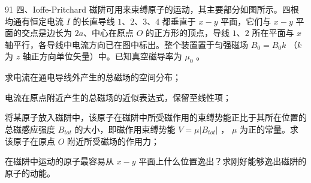 \begin{problem}[第35届全国中学生物理竞赛复赛][磁阱束缚]{91}
四、Ioffe-Pritchard 磁阱可用来束缚原子的运动，其主要部分如图所示。四根均通有恒定电流 $I$ 的长直导线 $1$、$2$、$3$、$4$ 都垂直于 $x-y$ 平面，它们与 $x-y$ 平面的交点是边长为 $2a$、中心在原点 $O$ 的正方形的顶点，导线 $1$、$2$ 所在平面与 $x$ 轴平行，各导线中电流方向已在图中标出。整个装置置于匀强磁场 $B_{0}=B_{0}k$ （$k$ 为 $z$ 轴正方向单位矢量）中。已知真空磁导率为 $\mu_{0}$ 。
\begin{subproblem}
求电流在通电导线外产生的总磁场的空间分布；
\end{subproblem}
\begin{subproblem}
电流在原点附近产生的总磁场的近似表达式，保留至线性项；
\end{subproblem}
\begin{subproblem}
将某原子放入磁阱中，该原子在磁阱中所受磁作用的束缚势能正比于其所在位置的总磁感应强度 $B_{tot}$ 的大小，即磁作用束缚势能 $V = \mu |B_{tot}|$ ， $\mu$ 为正的常量。求该原子在原点 $O$ 附近所受磁场的作用力；
\end{subproblem}
\begin{subproblem}
在磁阱中运动的原子最容易从 $x - y$ 平面上什么位置逸出？求刚好能够逸出磁阱的原子的动能。
\end{subproblem}
\end{problem}

